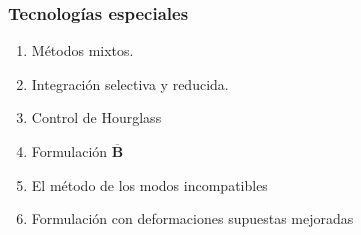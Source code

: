 \documentclass{beamer}
\begin{document}
\begin{frame}
\frametitle{Tecnologías especiales}
\begin{enumerate}
\item Métodos mixtos.
\item Integración selectiva y reducida.
\item Control de Hourglass
\item Formulación $\overline{\bm{B}}$
\item El método de los modos incompatibles
\item Formulación con deformaciones supuestas mejoradas
\end{enumerate}
\end{frame}
\end{document}
